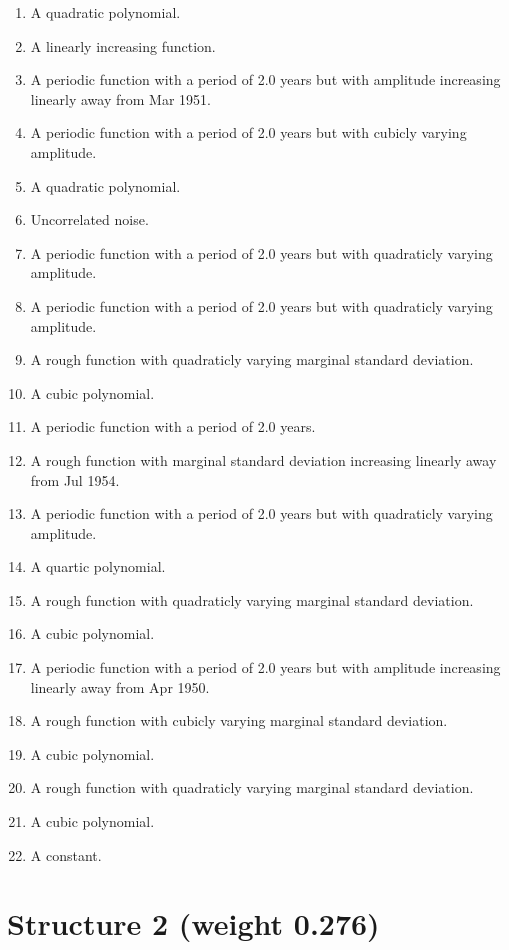 \documentclass[11pt,a4paper]{article}
\begin{document}
\begin{enumerate}
  \item A quadratic polynomial.
  \item A linearly increasing function.
  \item A periodic function with a period of 2.0 years but with amplitude increasing linearly away from Mar 1951.
  \item A periodic function with a period of 2.0 years but with cubicly varying amplitude.
  \item A quadratic polynomial.
  \item Uncorrelated noise.
  \item A periodic function with a period of 2.0 years but with quadraticly varying amplitude.
  \item A periodic function with a period of 2.0 years but with quadraticly varying amplitude.
  \item A rough function with quadraticly varying marginal standard deviation.
  \item A cubic polynomial.
  \item A periodic function with a period of 2.0 years.
  \item A rough function with marginal standard deviation increasing linearly away from Jul 1954.
  \item A periodic function with a period of 2.0 years but with quadraticly varying amplitude.
  \item A quartic polynomial.
  \item A rough function with quadraticly varying marginal standard deviation.
  \item A cubic polynomial.
  \item A periodic function with a period of 2.0 years but with amplitude increasing linearly away from Apr 1950.
  \item A rough function with cubicly varying marginal standard deviation.
  \item A cubic polynomial.
  \item A rough function with quadraticly varying marginal standard deviation.
  \item A cubic polynomial.
  \item A constant.
\end{enumerate}

\section*{Structure 2 (weight 0.276)}
\end{document}

